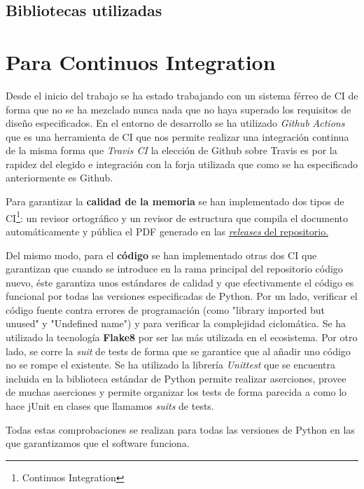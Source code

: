 \subsection{Bibliotecas utilizadas}

\section{Para Continuos Integration}
Desde el inicio del trabajo se ha estado trabajando con un sistema férreo de CI de forma que no se ha mezclado nunca nada que no haya superado los requisitos de diseño especificados. En el entorno de desarrollo se ha utilizado \textit{Github Actions} que es una herramienta de CI que nos permite realizar una integración continua de la misma forma que \textit{Travis CI} la elección de Github sobre Travis es por la rapidez del elegido e integración con la forja utilizada que como se ha especificado anteriormente es Github.

Para garantizar la \textbf{calidad de la memoria} se han implementado dos tipos de CI\footnote{Continuos Integration}: un revisor ortográfico y un revisor de estructura que compila el documento automáticamente y pública el PDF generado en las \href{https://github.com/pablojjimenez/TFG/releases}{\textit{releases} del repositorio.}

Del mismo modo, para el \textbf{código} se han implementado otras dos CI que garantizan que cuando se introduce en la rama principal del repositorio código nuevo, éste garantiza unos estándares de calidad y que efectivamente el código es funcional por todas las versiones especificadas de Python. Por un lado, verificar el código fuente contra errores de programación (como "library imported but unused" y "Undefined name") y para verificar la complejidad ciclomática. Se ha utilizado la tecnología \cite{flake}\textbf{Flake8} por ser las más utilizada en el ecosistema.
Por otro lado, se corre la \textit{suit} de tests de forma que se garantice que al añadir uno código no se rompe el existente. Se ha utilizado la librería \textit{Unittest} que se encuentra incluida en la biblioteca estándar de Python permite realizar aserciones, provee de muchas aserciones y permite organizar los tests de forma parecida a como lo hace jUnit en clases que llamamos \textit{suits} de tests.

Todas estas comprobaciones se realizan para todas las versiones de Python en las que garantizamos que el software funciona.

